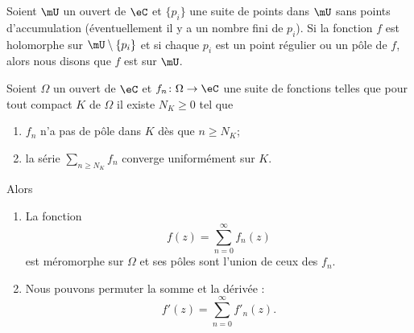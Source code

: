 \begin{definition}
    Soient \( \mU\) un ouvert de \( \eC\) et \( \{ p_i \}\) une suite de points dans \( \mU\) sans points d'accumulation (éventuellement il y a un nombre fini de \( p_i\)). Si la fonction \( f\) est holomorphe sur \( \mU\setminus\{ p_i \}\) et si chaque \( p_i\) est un point régulier ou un pôle de \( f\), alors nous disons que \( f\) est  sur \( \mU\).
\end{definition}

\begin{proposition} \label{PropPUZTQKl}
    Soient \( \Omega\) un ouvert de \( \eC\) et \( f_n\colon \Omega\to \eC\) une suite de fonctions telles que pour tout compact \( K\) de \( \Omega\) il existe \( N_K\geq 0\) tel que
    \begin{enumerate}
        \item
            \( f_n\) n'a pas de pôle dans \( K\) dès que \( n\geq N_K\);
        \item
            la série \( \sum_{n\geq N_K}f_n\) converge uniformément sur \( K\).
    \end{enumerate}
    Alors
    \begin{enumerate}
        \item
            La fonction
            \begin{equation}
                f(z)=\sum_{n=0}^{\infty}f_n(z)
            \end{equation}
            est méromorphe sur \( \Omega\) et ses pôles sont l'union de ceux des \( f_n\).
        \item
            Nous pouvons permuter la somme et la dérivée :
            \begin{equation}
                f'(z)=\sum_{n=0}^{\infty}f'_n(z).
            \end{equation}
    \end{enumerate}
\end{proposition}

